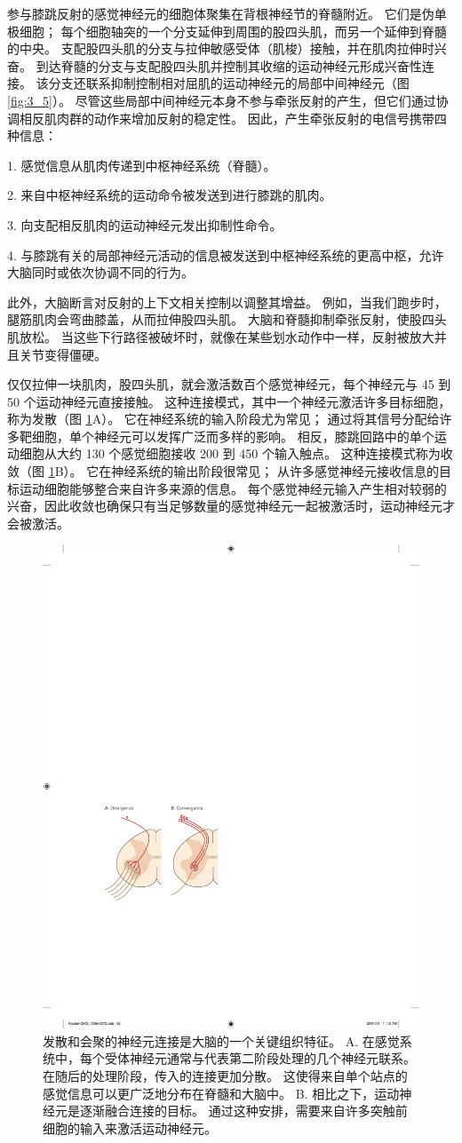 参与膝跳反射的感觉神经元的细胞体聚集在背根神经节的脊髓附近。 
它们是伪单极细胞； 每个细胞轴突的一个分支延伸到周围的股四头肌，而另一个延伸到脊髓的中央。 
支配股四头肌的分支与拉伸敏感受体（肌梭）接触，并在肌肉拉伸时兴奋。 
到达脊髓的分支与支配股四头肌并控制其收缩的运动神经元形成兴奋性连接。 
该分支还联系抑制控制相对屈肌的运动神经元的局部中间神经元（图 \ref{fig:3_5}）。 
尽管这些局部中间神经元本身不参与牵张反射的产生，但它们通过协调相反肌肉群的动作来增加反射的稳定性。 
因此，产生牵张反射的电信号携带四种信息：

1. 感觉信息从肌肉传递到中枢神经系统（脊髓）。

2. 来自中枢神经系统的运动命令被发送到进行膝跳的肌肉。

3. 向支配相反肌肉的运动神经元发出抑制性命令。

4. 与膝跳有关的局部神经元活动的信息被发送到中枢神经系统的更高中枢，允许大脑同时或依次协调不同的行为。

此外，大脑断言对反射的上下文相关控制以调整其增益。 
例如，当我们跑步时，腿筋肌肉会弯曲膝盖，从而拉伸股四头肌。 
大脑和脊髓抑制牵张反射，使股四头肌放松。 
当这些下行路径被破坏时，就像在某些划水动作中一样，反射被放大并且关节变得僵硬。


仅仅拉伸一块肌肉，股四头肌，就会激活数百个感觉神经元，每个神经元与 45 到 50 个运动神经元直接接触。 
这种连接模式，其中一个神经元激活许多目标细胞，称为发散（图 \ref{fig:3_6}A）。 
它在神经系统的输入阶段尤为常见； 通过将其信号分配给许多靶细胞，单个神经元可以发挥广泛而多样的影响。 
相反，膝跳回路中的单个运动细胞从大约 130 个感觉细胞接收 200 到 450 个输入触点。 
这种连接模式称为收敛（图 \ref{fig:3_6}B）。 
它在神经系统的输出阶段很常见； 从许多感觉神经元接收信息的目标运动细胞能够整合来自许多来源的信息。 
每个感觉神经元输入产生相对较弱的兴奋，因此收敛也确保只有当足够数量的感觉神经元一起被激活时，运动神经元才会被激活。


\begin{figure}[htbp]
	\centering
	\includegraphics[width=0.5\linewidth]{chap03/fig_3_6}
	\caption{发散和会聚的神经元连接是大脑的一个关键组织特征。 
		A. 在感觉系统中，每个受体神经元通常与代表第二阶段处理的几个神经元联系。 
		在随后的处理阶段，传入的连接更加分散。 
		这使得来自单个站点的感觉信息可以更广泛地分布在脊髓和大脑中。 
		B. 相比之下，运动神经元是逐渐融合连接的目标。 
		通过这种安排，需要来自许多突触前细胞的输入来激活运动神经元。}
	\label{fig:3_6}
\end{figure}


